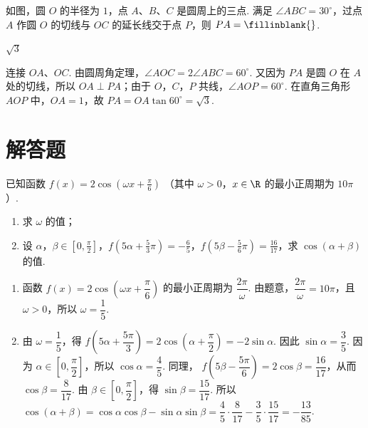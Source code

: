 \begin{problem}
如图，圆 \(O\) 的半径为 \(1\)，点 \(A\)、\(B\)、\(C\) 是圆周上的三点. 满足 \(\angle ABC = 30^{\circ}\)，过点 \(A\) 作圆 \(O\) 的切线与 \(OC\) 的延长线交于点 \(P\)，则 \(PA =\fillinblank{}\).

\end{problem}

\begin{answer}
\(\sqrt{3}\)
\end{answer}

\begin{solution}
连接 \(OA\)、\(OC\). 由圆周角定理，\(\angle AOC=2\angle ABC=60^{\circ}\). 又因为 \(PA\) 是圆 \(O\) 在 \(A\) 处的切线，所以 \(OA\perp PA\)；由于 \(O\)，\(C\)，\(P\) 共线，\(\angle AOP=60^{\circ}\). 在直角三角形 \(AOP\) 中，\(OA=1\)，故
\(PA=OA\tan60^{\circ}=\sqrt{3}\).
\end{solution}

\section{解答题}

\begin{problem}
已知函数 \( f(x) = 2\cos \left( \omega x + \frac{\pi}{6} \right) \) （其中 \(\omega > 0\)，\(x \in \R\) 的最小正周期为 \( 10\pi \)）.
\begin{enumerate}
\item 求 \( \omega \) 的值；
\item 设 \(\alpha\)，\(\beta \in \left[0, \frac{\pi}{2}\right]\)，\( f\left( 5\alpha + \frac{5}{3}\pi \right) = -\frac{6}{5} \)，\( f\left( 5\beta - \frac{5}{6}\pi \right) = \frac{16}{17} \)，求 \( \cos (\alpha + \beta) \) 的值.
\end{enumerate}
\end{problem}

\begin{solution}
\begin{enumerate}
\item 函数 \(f(x)=2\cos\left(\omega x+\dfrac{\pi}{6}\right)\) 的最小正周期为 \(\dfrac{2\pi}{\omega}\). 由题意，\(\dfrac{2\pi}{\omega}=10\pi\)，且 \(\omega>0\)，所以 \(\omega=\dfrac{1}{5}\).
\item 由 \(\omega=\dfrac{1}{5}\)，得
\(f\left(5\alpha+\dfrac{5\pi}{3}\right)=2\cos\left(\alpha+\dfrac{\pi}{2}\right)=-2\sin\alpha\). 因此 \(\sin\alpha=\dfrac{3}{5}\). 因为 \(\alpha\in\left[0,\dfrac{\pi}{2}\right]\)，所以 \(\cos\alpha=\dfrac{4}{5}\). 同理，
\(f\left(5\beta-\dfrac{5\pi}{6}\right)=2\cos\beta=\dfrac{16}{17}\)，从而 \(\cos\beta=\dfrac{8}{17}\). 由 \(\beta\in\left[0,\dfrac{\pi}{2}\right]\)，得 \(\sin\beta=\dfrac{15}{17}\). 所以
\(\cos(\alpha+\beta)=\cos\alpha\cos\beta-\sin\alpha\sin\beta=\dfrac{4}{5}\cdot\dfrac{8}{17}-\dfrac{3}{5}\cdot\dfrac{15}{17}=-\dfrac{13}{85}\).
\end{enumerate}
\end{solution}

